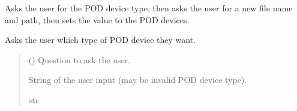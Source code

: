 \documentclass[letterpaper,10pt,english]{sphinxmanual}
\begin{document}
\begin{fulllineitems}
\begin{fulllineitems}
\end{fulllineitems}


\begin{fulllineitems}
\label{\detokenize{Setup.SetupAllDevices:Setup.SetupAllDevices.Setup_PodDevices.SetupAll._EditSaveFilePath}}
\pysigstartsignatures
{}
\pysigstopsignatures
\sphinxAtStartPar
Asks the user for the POD device type, then asks the user for a new file name and path,         then sets the value to the POD devices.

\end{fulllineitems}


\begin{fulllineitems}
\label{\detokenize{Setup.SetupAllDevices:Setup.SetupAllDevices.Setup_PodDevices.SetupAll._GetChosenDeviceType}}
\pysigstartsignatures
{}
\pysigstopsignatures
\sphinxAtStartPar
Asks the user which type of POD device they want.
\begin{quote}\begin{description}
\sphinxAtStartPar
{} () \textendash{} Question to ask the user.

\sphinxAtStartPar
String of the user input (may be invalid POD device type).

\sphinxAtStartPar
str

\end{description}\end{quote}

\end{fulllineitems}



\end{fulllineitems}
\end{document}
